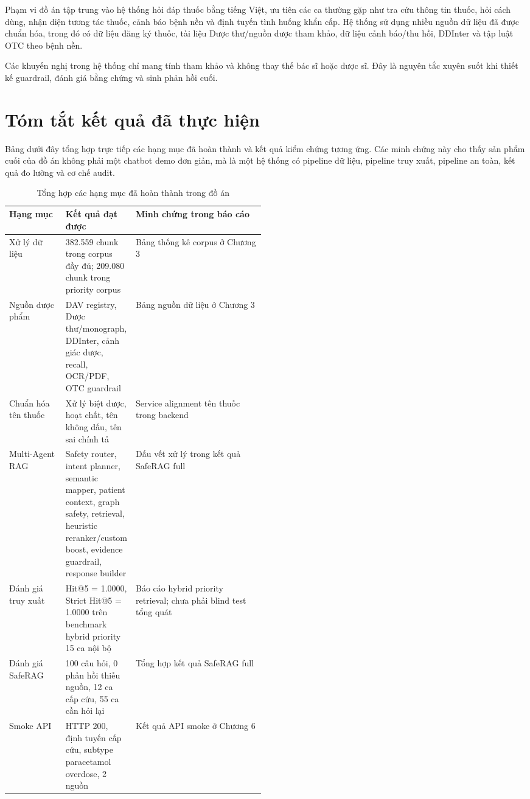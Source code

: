Phạm vi đồ án tập trung vào hệ thống hỏi đáp thuốc bằng tiếng Việt, ưu tiên các ca thường gặp như tra cứu thông tin thuốc, hỏi cách dùng, nhận diện tương tác thuốc, cảnh báo bệnh nền và định tuyến tình huống khẩn cấp. Hệ thống sử dụng nhiều nguồn dữ liệu đã được chuẩn hóa, trong đó có dữ liệu đăng ký thuốc, tài liệu Dược thư/nguồn dược tham khảo, dữ liệu cảnh báo/thu hồi, DDInter và tập luật OTC theo bệnh nền.

Các khuyến nghị trong hệ thống chỉ mang tính tham khảo và không thay thế bác sĩ hoặc dược sĩ. Đây là nguyên tắc xuyên suốt khi thiết kế guardrail, đánh giá bằng chứng và sinh phản hồi cuối.

\section*{Tóm tắt kết quả đã thực hiện}

Bảng dưới đây tổng hợp trực tiếp các hạng mục đã hoàn thành và kết quả kiểm chứng tương ứng. Các minh chứng này cho thấy sản phẩm cuối của đồ án không phải một chatbot demo đơn giản, mà là một hệ thống có pipeline dữ liệu, pipeline truy xuất, pipeline an toàn, kết quả đo lường và cơ chế audit.

\begin{table}[H]
\centering
\footnotesize
\caption{Tổng hợp các hạng mục đã hoàn thành trong đồ án}
\begin{tabularx}{\linewidth}{p{0.22\linewidth} p{0.27\linewidth} Y}
\toprule
\textbf{Hạng mục} & \textbf{Kết quả đạt được} & \textbf{Minh chứng trong báo cáo} \\
\midrule
Xử lý dữ liệu & 382.559 chunk trong corpus đầy đủ; 209.080 chunk trong priority corpus & Bảng thống kê corpus ở Chương 3 \\
Nguồn dược phẩm & DAV registry, Dược thư/monograph, DDInter, cảnh giác dược, recall, OCR/PDF, OTC guardrail & Bảng nguồn dữ liệu ở Chương 3 \\
Chuẩn hóa tên thuốc & Xử lý biệt dược, hoạt chất, tên không dấu, tên sai chính tả & Service alignment tên thuốc trong backend \\
Multi-Agent RAG & Safety router, intent planner, semantic mapper, patient context, graph safety, retrieval, heuristic reranker/custom boost, evidence guardrail, response builder & Dấu vết xử lý trong kết quả SafeRAG full \\
Đánh giá truy xuất & Hit@5 = 1.0000, Strict Hit@5 = 1.0000 trên benchmark hybrid priority 15 ca nội bộ & Báo cáo hybrid priority retrieval; chưa phải blind test tổng quát \\
Đánh giá SafeRAG & 100 câu hỏi, 0 phản hồi thiếu nguồn, 12 ca cấp cứu, 55 ca cần hỏi lại & Tổng hợp kết quả SafeRAG full \\
Smoke API & HTTP 200, định tuyến cấp cứu, subtype paracetamol overdose, 2 nguồn & Kết quả API smoke ở Chương 6 \\
\bottomrule
\end{tabularx}
\end{table}
